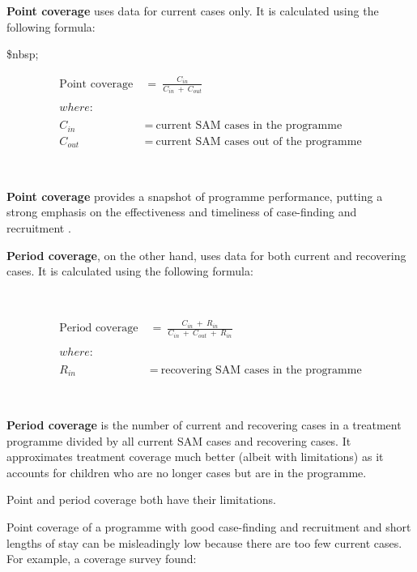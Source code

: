 \documentclass[12pt,a4paper]{book}
\theoremstyle{definition}
\theoremstyle{definition}
\theoremstyle{definition}
\theoremstyle{remark}
\begin{document}
\textbf{Point coverage} uses data for current cases only. It is
calculated using the following formula:

\$nbsp;

\[\begin{aligned} 
\text{Point coverage} & ~ = ~ \frac{C_{in}}{C_{in} ~ + ~ C_{out}} \\
\\
where: & \\
\\
C_{in} & ~ = ~ \text{current SAM cases in the programme} \\
C_{out} & ~ = ~ \text{current SAM cases out of the programme}
\end{aligned}\]

~

\textbf{Point coverage} provides a snapshot of programme performance,
putting a strong emphasis on the effectiveness and timeliness of
case-finding and recruitment \citep{Myatt:2012tt}.

\textbf{Period coverage}, on the other hand, uses data for both current
and recovering cases. It is calculated using the following formula:

~

\[\begin{aligned}
\text{Period coverage} & ~ = ~ \frac{C_{in} ~ + ~ R_{in}}{C_{in} ~ + ~ C_{out} ~ + ~ R_{in}} \\
\\
where: & \\
\\
R_{in} & ~ = ~ \text{recovering SAM cases in the programme}
\end{aligned}\]

~

\textbf{Period coverage} is the number of current and recovering cases
in a treatment programme divided by all current SAM cases and recovering
cases. It approximates treatment coverage much better (albeit with
limitations) as it accounts for children who are no longer cases but are
in the programme.

Point and period coverage both have their limitations.

Point coverage of a programme with good case-finding and recruitment and
short lengths of stay can be misleadingly low because there are too few
current cases. For example, a coverage survey found:

~
\end{document}
